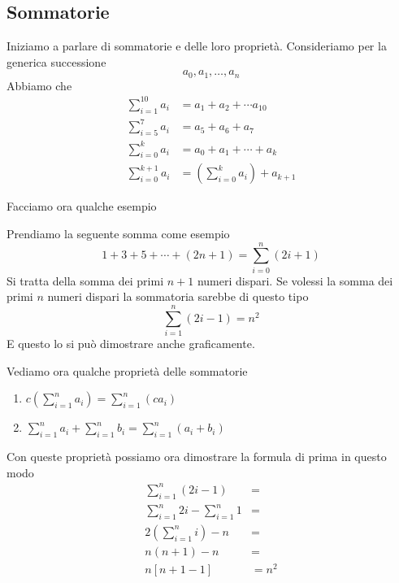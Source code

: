 \subsection{Sommatorie}
Iniziamo a parlare di sommatorie e delle loro propriet\`a. Consideriamo per la generica
successione
\begin{equation*}
	a_0, a_1, \dots, a_n
\end{equation*}
Abbiamo che
\begin{align*}
	\sum_{i = 1}^{10} a_i    & = a_1 + a_2 + \cdots a_{10}                     \\
	\sum_{i = 5}^7 a_i       & = a_5 + a_6 + a_7                               \\
	\sum_{i = 0}^k a_i       & = a_0 + a_1 + \cdots + a_k                      \\
	\sum_{i = 0}^{k + 1} a_i & = \left( \sum_{i = 0}^k a_i \right) + a_{k + 1}
\end{align*}

Facciamo ora qualche esempio
\begin{example}
	Prendiamo la seguente somma come esempio
	\begin{equation*}
		1 + 3 + 5 + \cdots + (2n + 1) = \sum_{i = 0}^n (2i + 1)
	\end{equation*}
	Si tratta della somma dei primi $n + 1$ numeri dispari.
	Se volessi la somma dei primi $n$ numeri dispari la sommatoria sarebbe di questo tipo
	\begin{equation*}
		\sum_{i = 1}^n (2i - 1) = n^2
	\end{equation*}
	E questo lo si pu\`o dimostrare anche graficamente.
\end{example}

Vediamo ora qualche propriet\`a delle sommatorie
\begin{enumerate}
	\item $c \left( \sum_{i = 1}^n a_i \right) = \sum_{i = 1}^n (c a_i)$
	\item $\sum_{i = 1}^n a_i + \sum_{i = 1}^n b_i = \sum_{i = 1}^n (a_i + b_i)$
\end{enumerate}

Con queste propriet\`a possiamo ora dimostrare la formula di prima in questo modo
\begin{align*}
	\sum_{i = 1}^n (2i - 1)               & =     \\
	\sum_{i = 1}^n 2i - \sum_{i = 1}^n 1  & =     \\
	2 \left( \sum_{i = 1}^n i \right) - n & =     \\
	n(n + 1) - n                          & =     \\
	n [n + 1 - 1]                         & = n^2
\end{align*}

